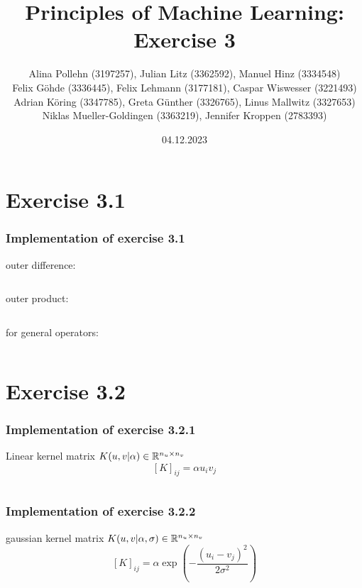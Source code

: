 \documentclass[10pt,aspectratio=169,handout]{beamer}
\begin{document}
\title{Principles of Machine Learning: Exercise 3}
\date{04.12.2023}
\author{Alina Pollehn (3197257), Julian Litz (3362592), Manuel Hinz (3334548)\\
    Felix Göhde (3336445), Felix Lehmann (3177181), Caspar Wiswesser (3221493)\\
    Adrian Köring (3347785), Greta Günther (3326765), Linus Mallwitz (3327653)\\
    Niklas Mueller-Goldingen (3363219), Jennifer Kroppen (2783393)}

\begin{frame}
    \maketitle
\end{frame}

\section{Exercise 3.1}

\begin{frame}

    \frametitle{Implementation of exercise 3.1}

    outer difference: 
    \inputminted[bgcolor=LightGray,fontsize=\small]{python}{code/diffMatrix.py}

    outer product: 
    \inputminted[bgcolor=LightGray,fontsize=\small]{python}{code/prodMatrix.py}
    
    for general operators:
    \inputminted[bgcolor=LightGray,fontsize=\small]{python}{code/operatorMatrix.py}
    
\end{frame}

\section{Exercise 3.2}

\begin{frame}

    \frametitle{Implementation of exercise 3.2.1}
    
        Linear kernel matrix $K(u,v|\alpha)\in \mathbb{R}^{n_u\times n_v}$
        \[[K]_{ij}=\alpha u_i v_j\]
        \inputminted[bgcolor=LightGray,fontsize=\small]{python}{code/linearMatrix.py}


\end{frame}

\begin{frame}

    \frametitle{Implementation of exercise 3.2.2}
    
        gaussian kernel matrix $K(u,v|\alpha,\sigma)\in \mathbb{R}^{n_u\times n_v}$
        \[[K]_{ij}=\alpha \exp\left(-\frac{(u_i-v_j)^2}{2\sigma^2}\right)\]
        \inputminted[bgcolor=LightGray,fontsize=\small]{python}{code/gausMatrix.py}

\end{frame}
\end{document}
